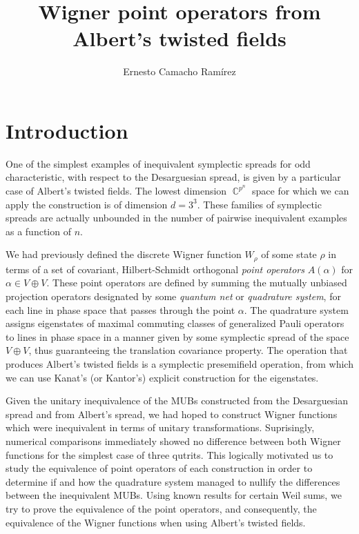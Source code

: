 \documentclass[a4paper, 11pt]{article}
\title{Wigner point operators from Albert's twisted fields}
\author{Ernesto Camacho Ramírez}
\DeclareMathOperator{\C}{\mathbb{C}}
\begin{document}
  \maketitle

  \section{Introduction}

  One of the simplest examples of inequivalent symplectic
  spreads for odd characteristic, with respect to the
  Desarguesian spread, is given by a particular case of
  Albert's twisted fields.  The lowest dimension
  $\C^{p^{n}}$ space for which we can apply the construction
  is of dimension $d = 3^{3}$. These families of symplectic
  spreads are actually unbounded in the number of pairwise
  inequivalent examples as a function of $n$.

  We had previously defined the discrete Wigner function
  $W_\rho$ of some state $\rho$ in terms of a set of
  covariant, Hilbert-Schmidt orthogonal \textit{point
  operators} $A(\alpha)$ for $\alpha \in V \oplus V$. These
  point operators are defined by summing the mutually
  unbiased projection operators designated by some
  \textit{quantum net} or \textit{quadrature system}, for
  each line in phase space that passes through the point
  $\alpha$. The quadrature system assigns eigenstates of
  maximal commuting classes of generalized Pauli operators
  to lines in phase space in a manner given by some
  symplectic spread of the space $V \oplus V$, thus
  guaranteeing the translation covariance property. The
  operation that produces Albert's twisted fields is a
  symplectic presemifield operation, from which we can use
  Kanat's (or Kantor's) explicit construction for the
  eigenstates.

  Given the unitary inequivalence of the MUBs constructed
  from the Desarguesian spread and from Albert's spread, we
  had hoped to construct Wigner functions which were
  inequivalent in terms of unitary transformations.
  Suprisingly, numerical comparisons immediately showed no
  difference between both Wigner functions for the simplest
  case of three qutrits. This logically motivated us to
  study the equivalence of point operators of each
  construction in order to determine if and how the
  quadrature system managed to nullify the differences
  between the inequivalent MUBs. Using known results for
  certain Weil sums, we try to prove the equivalence of the
  point operators, and consequently, the equivalence of the
  Wigner functions when using Albert's twisted fields.
\end{document}
